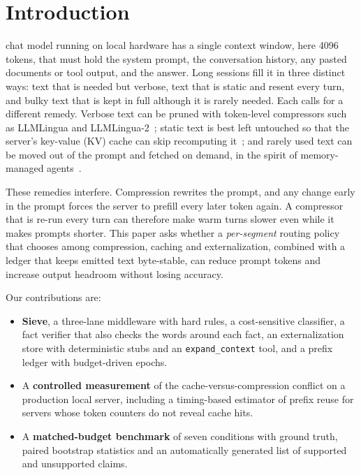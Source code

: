 \documentclass[journal]{IEEEtran}
\begin{document}
\section{Introduction}
 chat model running on local hardware has a single context window, here 4096 tokens, that must hold
the system prompt, the conversation history, any pasted documents or tool output, and the answer. Long sessions fill it in three distinct
ways: text that is needed but verbose, text that is static and resent every turn, and bulky text that is kept in full although it is rarely
needed. Each calls for a different remedy. Verbose text can be pruned with token-level compressors such as LLMLingua and
LLMLingua-2~\cite{jiang2023llmlingua,pan2024llmlingua2}; static text is best left untouched so that the server's key-value (KV) cache can
skip recomputing it~\cite{kwon2023vllm,gim2024promptcache,zheng2024sglang}; and rarely used text can be moved out of the prompt and
fetched on demand, in the spirit of memory-managed agents~\cite{packer2023memgpt}.

These remedies interfere. Compression rewrites the prompt, and any change early in the prompt forces the server to prefill every later token
again. A compressor that is re-run every turn can therefore make warm turns slower even while it makes prompts shorter. This paper asks whether
a \emph{per-segment} routing policy that chooses among compression, caching and externalization, combined with a ledger that keeps emitted
text byte-stable, can reduce prompt tokens and increase output headroom without losing accuracy.

Our contributions are:
\begin{itemize}
\item \textbf{Sieve}, a three-lane middleware with hard rules, a cost-sensitive classifier, a fact verifier that also checks the words
around each fact, an externalization store with deterministic stubs and an \texttt{expand\_context} tool, and a prefix ledger with budget-driven epochs.
\item A \textbf{controlled measurement} of the cache-versus-compression conflict on a production local server, including a timing-based
estimator of prefix reuse for servers whose token counters do not reveal cache hits.
\item A \textbf{matched-budget benchmark} of seven conditions with ground truth, paired bootstrap statistics and an automatically generated
list of supported and unsupported claims.
\end{itemize}
\end{document}
